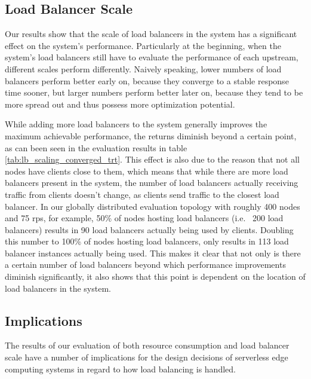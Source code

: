 \subsection{Load Balancer Scale}
Our results show that the scale of load balancers in the system has a significant effect on the system's performance.
Particularly at the beginning, when the system's load balancers still have to evaluate the performance of each upstream, different scales perform differently.
Naively speaking, lower numbers of load balancers perform better early on, because they converge to a stable response time sooner, but larger numbers perform better later on, because they tend to be more spread out and thus possess more optimization potential.

While adding more load balancers to the system generally improves the maximum achievable performance, the returns diminish beyond a certain point, as can been seen in the evaluation results in table \ref{tab:lb_scaling_converged_trt}.
This effect is also due to the reason that not all nodes have clients close to them, which means that while there are more load balancers present in the system, the number of load balancers actually receiving traffic from clients doesn't change, as clients send traffic to the closest load balancer.
In our globally distributed evaluation topology with roughly 400 nodes and 75 \gls{rps}, for example, 50\% of nodes hosting load balancers (i.e. ~200 load balancers) results in 90 load balancers actually being used by clients. Doubling this number to 100\% of nodes hosting load balancers, only results in 113 load balancer instances actually being used.
This makes it clear that not only is there a certain number of load balancers beyond which performance improvements diminish significantly, it also shows that this point is dependent on the location of load balancers in the system.

\subsection{Implications}
The results of our evaluation of both resource consumption and load balancer scale have a number of implications for the design decisions of serverless edge computing systems in regard to how load balancing is handled.

